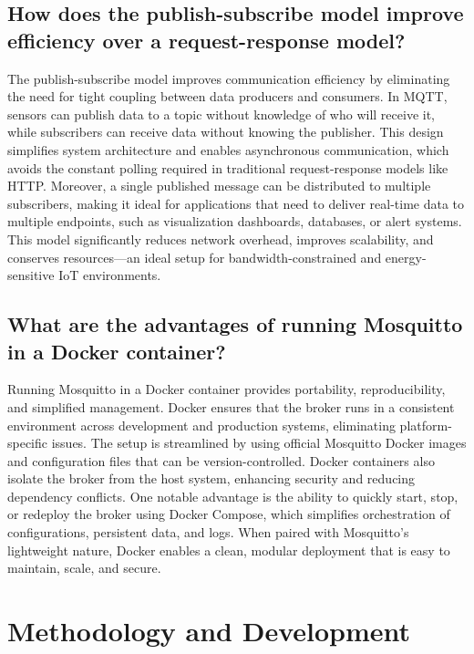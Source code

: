 \documentclass[a4paper,12pt]{article}
\begin{document}
\subsection*{How does the publish-subscribe model improve efficiency over a request-response model?}
The publish-subscribe model improves communication efficiency by eliminating the need for tight coupling between data producers and consumers. In MQTT, sensors can publish data to a topic without knowledge of who will receive it, while subscribers can receive data without knowing the publisher. This design simplifies system architecture and enables asynchronous communication, which avoids the constant polling required in traditional request-response models like HTTP. Moreover, a single published message can be distributed to multiple subscribers, making it ideal for applications that need to deliver real-time data to multiple endpoints, such as visualization dashboards, databases, or alert systems. This model significantly reduces network overhead, improves scalability, and conserves resources—an ideal setup for bandwidth-constrained and energy-sensitive IoT environments.

\subsection*{What are the advantages of running Mosquitto in a Docker container?}
Running Mosquitto in a Docker container provides portability, reproducibility, and simplified management. Docker ensures that the broker runs in a consistent environment across development and production systems, eliminating platform-specific issues. The setup is streamlined by using official Mosquitto Docker images and configuration files that can be version-controlled. Docker containers also isolate the broker from the host system, enhancing security and reducing dependency conflicts. One notable advantage is the ability to quickly start, stop, or redeploy the broker using Docker Compose, which simplifies orchestration of configurations, persistent data, and logs. When paired with Mosquitto’s lightweight nature, Docker enables a clean, modular deployment that is easy to maintain, scale, and secure.

\section{Methodology and Development}
\end{document}
